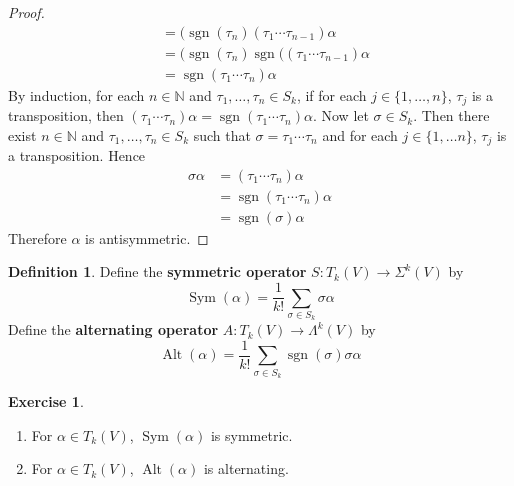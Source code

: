 \documentclass{book}
\theoremstyle{definition}
\newtheorem{defn}[definition]{Definition}
\newtheorem{ex}[definition]{Exercise}
\newcommand{\al}{\alpha}
\newcommand{\sig}{\sigma}
\newcommand{\Lam}{\Lambda}
\newcommand{\Sig}{\Sigma}
\newcommand{\N}{\mathbb{N}}
\DeclareMathOperator{\sgn}{sgn}
\DeclareMathOperator{\Sym}{Sym}
\DeclareMathOperator{\Alt}{Alt}
\DeclareMathOperator*{\0}{\mbf{0}}
\DeclareMathOperator*{\1}{\mbf{1}}
\newcommand{\tbf}[1]{\textbf{#1}}
\begin{document}
\begin{proof}
\begin{align*}
			& = (\sgn(\tau_n ) (\tau_1 \cdots \tau_{n-1}) \al \\
			& = (\sgn(\tau_n ) \sgn((\tau_1 \cdots \tau_{n-1}) \al \\
			& = \sgn(\tau_1 \cdots \tau_n) \al 
		\end{align*}
		By induction, for each $n \in \N$ and $\tau_1, \ldots, \tau_n \in S_k$, if for each $j \in \{1, \ldots, n\}$, $\tau_j$ is a transposition, then $(\tau_1 \cdots \tau_n) \al  = \sgn(\tau_1 \cdots \tau_n) \al$. Now let $\sig \in S_k$. Then there exist $n \in \N$ and $\tau_1, \ldots, \tau_n \in S_k$ such that $\sig = \tau_1 \cdots \tau_n$ and for each $j \in \{1, \ldots n\}$, $\tau_j$ is a transposition. Hence
		\begin{align*}
			\sig \al 
			& = (\tau_1 \cdots \tau_n) \al \\
			& =  \sgn(\tau_1 \cdots \tau_n) \al \\
			& = \sgn(\sig) \al
		\end{align*}
		Therefore $\al$ is antisymmetric.
	\end{proof}
	
	\begin{defn}
		Define the \tbf{symmetric operator} $S: T_k(V) \rightarrow \Sig^k(V)$ by $$\Sym(\al) = \frac{1}{k!}\sum_{\sig \in S_k} \sig \al$$  Define the \tbf{alternating operator} $A: T_k(V) \rightarrow \Lam^k(V)$ by $$\Alt(\al) = \frac{1}{k!}\sum_{\sig \in S_k} \sgn(\sig)\sig \al$$
	\end{defn}
	
	\begin{ex}\
		\begin{enumerate}
			\item For $\al \in T_k(V)$, $\Sym(\al)$ is symmetric.
			\item For $\al \in T_k(V)$, $\Alt(\al)$ is alternating.
		\end{enumerate}
	\end{ex}
\end{document}
